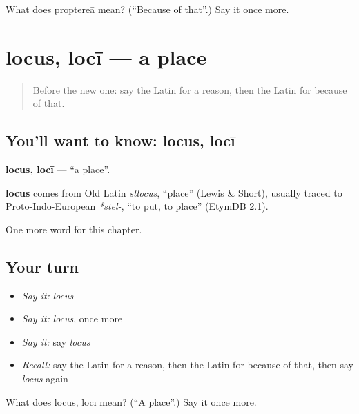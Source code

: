 \begin{tcolorbox}[breakable,colback=teal!4,colframe=teal!35!black,title={Before you move on}]
What does proptereā mean? (\textquotedblleft{}Because of that\textquotedblright{}.) Say it once more.
\end{tcolorbox}
\section[locus, locī]{locus, locī — a place}

\label{lesson:LA-C114-locus}



\begin{quote}
Before the new one: say the Latin for a reason, then the Latin for because of that.
\end{quote}

\subsection*{You'll want to know: locus, locī}
\textbf{locus, locī} — \textquotedblleft{}a place\textquotedblright{}.

\begin{cousinweb}
\textbf{locus} comes from Old Latin \emph{stlocus}, \textquotedblleft{}place\textquotedblright{} (Lewis \& Short), usually traced to Proto-Indo-European \emph{*stel-}, \textquotedblleft{}to put, to place\textquotedblright{} (EtymDB 2.1).
\end{cousinweb}

\begin{grammarlens}[title={What you've built}]
One more word for this chapter.
\end{grammarlens}

\subsection*{Your turn}
\begin{itemize}
\raggedright
  \item \emph{Say it:} \emph{locus}
  \item \emph{Say it:} \emph{locus}, once more
  \item \emph{Say it:} say \emph{locus}
  \item \emph{Recall:} say the Latin for a reason, then the Latin for because of that, then say \emph{locus} again
\end{itemize}

\begin{tcolorbox}[breakable,colback=teal!4,colframe=teal!35!black,title={Before you move on}]
What does locus, locī mean? (\textquotedblleft{}A place\textquotedblright{}.) Say it once more.
\end{tcolorbox}
